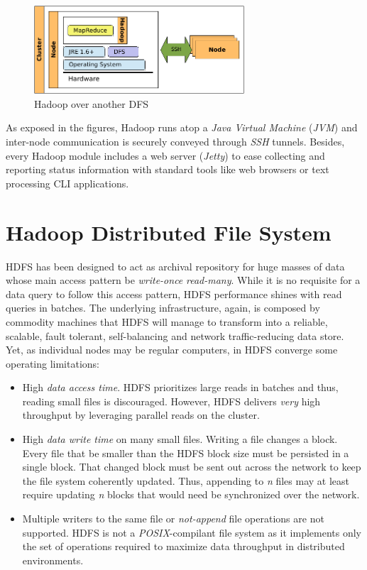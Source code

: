 \begin{figure}[tbp]
\begin{center}
\includegraphics[width=0.7\textwidth]{imagenes/016.pdf}
 \caption{Hadoop over another DFS}
\label{fig:hadoopmapreddfs}
\end{center}
\end{figure}

As exposed in the figures, Hadoop runs atop a \emph{Java Virtual Machine} (\emph{JVM}) and inter-node communication is securely conveyed through \emph{SSH} tunnels. Besides, every Hadoop module includes a web server (\emph{Jetty}) to ease collecting and reporting status information with standard tools like web browsers or text processing CLI applications.

\section{Hadoop Distributed File System}\label{sec:hdfs}
\noindent HDFS has been designed to act as archival repository for huge masses of data whose main access pattern be \emph{write-once} \emph{read-many}. While it is no requisite for a data query to follow this access pattern, HDFS performance shines with read queries in batches. The underlying infrastructure, again, is composed by commodity machines that HDFS will manage to transform into a reliable, scalable, fault tolerant, self-balancing and network traffic-reducing data store. Yet, as individual nodes may be regular computers, in HDFS converge some operating limitations:

\begin{itemize}
 \item High \emph{data access time}. HDFS prioritizes large reads in batches and thus, reading small files is  discouraged. However, HDFS delivers \emph{very} high throughput by leveraging parallel reads on the cluster.
 \item High \emph{data write time} on many small files. Writing a file changes a block. Every file that be smaller than the HDFS block size must be persisted in a single block. That changed block must be sent out across the network to keep the file system coherently updated. Thus, appending to \emph{n} files may at least require updating \emph{n} blocks that would need be synchronized over the network.
 \item Multiple writers to the same file or \emph{not-append} file operations are not supported. HDFS is not a \emph{POSIX}-compilant file system as it implements only the set of operations required to maximize data throughput in distributed environments.
\end{itemize}

